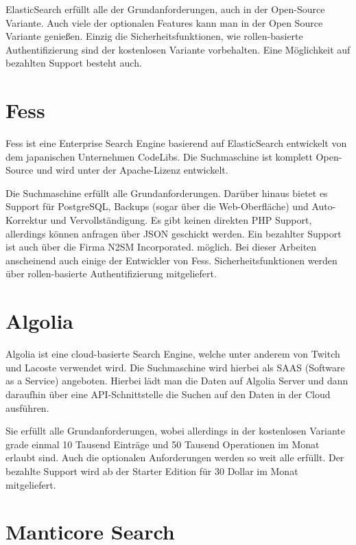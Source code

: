 ElasticSearch erfüllt alle der Grundanforderungen, auch in der Open-Source Variante. Auch viele der optionalen Features kann man in der Open Source Variante genießen. Einzig die Sicherheitsfunktionen, wie rollen-basierte Authentifizierung sind der kostenlosen Variante vorbehalten. Eine Möglichkeit auf bezahlten Support besteht auch. \cite{Elasticsearch.2019}

\section{Fess}
\label{fess}

Fess ist eine Enterprise Search Engine basierend auf ElasticSearch entwickelt von dem japanischen Unternehmen CodeLibs. Die Suchmaschine ist komplett Open-Source und wird unter der Apache-Lizenz entwickelt.

Die Suchmaschine erfüllt alle Grundanforderungen. Darüber hinaus bietet es Support für PostgreSQL, Backups (sogar über die Web-Oberfläche) und Auto-Korrektur und Vervollständigung. Es gibt keinen direkten PHP Support, allerdings können anfragen über JSON geschickt werden. Ein bezahlter Support ist auch über die Firma N2SM Incorporated. \cite{N2SM.2019} möglich. Bei dieser Arbeiten anscheinend auch einige der Entwickler von Fess. Sicherheitsfunktionen werden über rollen-basierte Authentifizierung mitgeliefert. \cite{CodeLibs.2019}

\section{Algolia}
\label{algolia}

Algolia ist eine cloud-basierte Search Engine, welche unter anderem von Twitch und Lacoste verwendet wird. Die Suchmaschine wird hierbei als SAAS (Software as a Service) angeboten.  Hierbei lädt man die Daten auf Algolia Server und dann daraufhin über eine API-Schnittstelle die Suchen auf den Daten in der Cloud ausführen.

Sie erfüllt alle Grundanforderungen, wobei allerdings in der kostenlosen Variante grade einmal 10 Tausend Einträge und 50 Tausend Operationen im Monat erlaubt sind. Auch die optionalen Anforderungen werden so weit alle erfüllt. Der bezahlte Support wird ab der Starter Edition für 30 Dollar im Monat mitgeliefert. \cite{Algolia.2019}

\section{Manticore Search}
\label{manticore}

